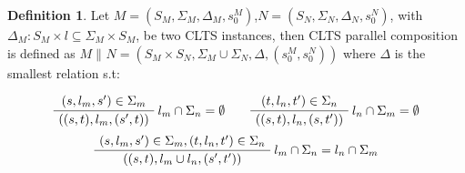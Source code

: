 \documentclass{article}
\theoremstyle{definition}
\newtheorem{definition}{Definition}[section]
\newcommand{\automaton}[1]{$#1 = (S_{#1}, \Sigma_{#1}, \Delta_{#1}, s_{0}^{#1})$}
\newcommand{\ltsComposition}[3]{$#1 \parallel_{#3} #2 = (S_{#1}\times S_{#2}, \Sigma_{#1} \cup \Sigma_{#2}, \Delta, (s_{0}^{#1},s_{0}^{#2}))$}
\begin{document}
\begin{definition} 
	Let \automaton{M},\automaton{N}, with $\Delta_M : S_M \times l \subseteq \Sigma_M \times S_M$, be two CLTS instances, then CLTS parallel composition is defined as \ltsComposition{M}{N}{} where $\Delta$ is the smallest relation s.t:
	\begin{center}
		\begin{equation}
			\AxiomC{$(s, l_m, s') \in \Sigma_m $}\RightLabel{$l_m \cap \Sigma_n = \emptyset$}
			\UnaryInfC{$((s,t),l_m,(s',t))$}
			\DisplayProof
			\quad\quad
			\AxiomC{$(t, l_n, t') \in \Sigma_n $}\RightLabel{$l_n \cap \Sigma_m = \emptyset$}
			\UnaryInfC{$((s,t),l_n,(s,t'))$}
			\DisplayProof
		\end{equation}		
		\begin{equation}
		\AxiomC{$(s, l_m, s') \in \Sigma_m,(t, l_n, t') \in \Sigma_n  $}\RightLabel{$l_m \cap \Sigma_n = l_n \cap \Sigma_m$}
		\UnaryInfC{$((s,t),l_m \cup l_n,(s',t'))$}
		\DisplayProof
		\end{equation}	
	\end{center}
\end{definition}
\end{document}
